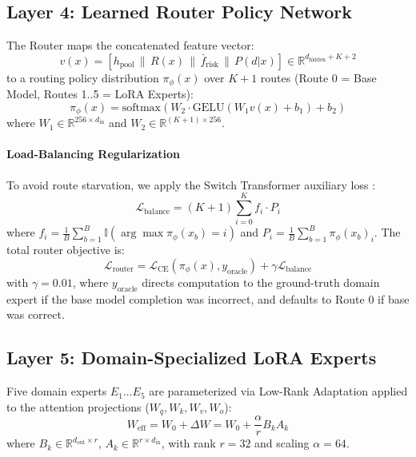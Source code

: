 \documentclass[journal,10pt,twocolumn]{IEEEtran}
\begin{document}
\subsection{Layer 4: Learned Router Policy Network}
The Router maps the concatenated feature vector:
\begin{equation}
v(x) = \left[ h_{\text{pool}} \,\|\, R(x) \,\|\, \bar{f}_{\text{risk}} \,\|\, P(d|x) \right] \in \mathbb{R}^{d_{\text{hidden}} + K + 2}
\end{equation}
to a routing policy distribution $\pi_\phi(x)$ over $K+1$ routes (Route 0 = Base Model, Routes 1..5 = LoRA Experts):
\begin{equation}
\pi_\phi(x) = \text{softmax}\left( W_2 \cdot \text{GELU}(W_1 v(x) + b_1) + b_2 \right)
\end{equation}
where $W_1 \in \mathbb{R}^{256 \times d_{\text{in}}}$ and $W_2 \in \mathbb{R}^{(K+1) \times 256}$.

\paragraph{Load-Balancing Regularization}
To avoid route starvation, we apply the Switch Transformer auxiliary loss \cite{fedus2022switch}:
\begin{equation}
\mathcal{L}_{\text{balance}} = (K+1) \sum_{i=0}^K f_i \cdot P_i
\end{equation}
where $f_i = \frac{1}{B} \sum_{b=1}^B \mathbb{I}(\arg\max \pi_\phi(x_b) = i)$ and $P_i = \frac{1}{B} \sum_{b=1}^B \pi_\phi(x_b)_i$. The total router objective is:
\begin{equation}
\mathcal{L}_{\text{router}} = \mathcal{L}_{\text{CE}}(\pi_\phi(x), y_{\text{oracle}}) + \gamma \mathcal{L}_{\text{balance}}
\end{equation}
with $\gamma = 0.01$, where $y_{\text{oracle}}$ directs computation to the ground-truth domain expert if the base model completion was incorrect, and defaults to Route 0 if base was correct.

\subsection{Layer 5: Domain-Specialized LoRA Experts}
Five domain experts $E_1 \dots E_5$ are parameterized via Low-Rank Adaptation \cite{hu2022lora} applied to the attention projections ($W_q, W_k, W_v, W_o$):
\begin{equation}
W_{\text{eff}} = W_0 + \Delta W = W_0 + \frac{\alpha}{r} B_k A_k
\end{equation}
where $B_k \in \mathbb{R}^{d_{\text{out}} \times r}$, $A_k \in \mathbb{R}^{r \times d_{\text{in}}}$, with rank $r=32$ and scaling $\alpha=64$.
\end{document}
